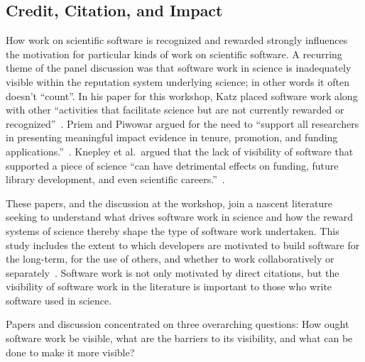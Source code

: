 \documentclass[11pt, oneside]{amsart}
\begin{document}
\subsection{Credit, Citation, and Impact}

How work on scientific software is recognized and rewarded strongly
influences the motivation for particular kinds of work on scientific
software. A recurring theme of the panel discussion was that software
work in science is inadequately visible within the reputation system
underlying science; in other words it often doesn't ``count''. In his
paper for this workshop, Katz placed software work along with other
``activities that facilitate science but are not currently rewarded or
recognized''~\cite{Katz_WSSSPE}. Priem and Piwowar argued for the need
to ``support all researchers in presenting meaningful impact evidence
in tenure, promotion, and funding applications.''~\cite{Priem_WSSSPE}.
Knepley et al.~argued that the lack of visibility of software that
supported a piece of science ``can have detrimental effects on
funding, future library development, and even scientific
careers.''~\cite{Knepley_WSSSPE}.

These papers, and the discussion at the workshop, join a nascent
literature seeking to understand what drives software work in science
and how the reward systems of science thereby shape the type of
software work undertaken. This study includes the extent to which developers are
motivated to build software for the long-term, for the use of others,
and whether to work collaboratively or
separately~\cite{howison_incentives_2013, howison_scientific_2011,
  bietz_synergizing_2010}. Software work is not only motivated by
direct citations, but the visibility of software work in the
literature is important to those who write software used in science.

Papers and discussion concentrated on three overarching questions: How
ought software work be visible, what are the barriers to its
visibility, and what can be done to make it more visible?
\end{document}
